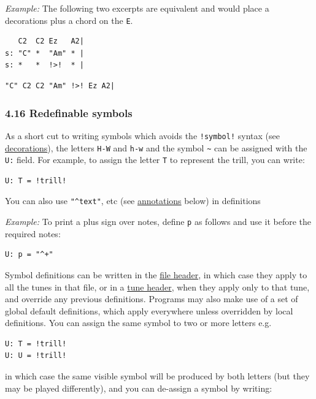 \documentclass[oneside]{book}
\begin{document}
\emph{Example:} The following two excerpts are equivalent and would
place a decorations plus a chord on the \texttt{E}.

\begin{verbatim}
   C2  C2 Ez   A2|
s: "C" *  "Am" * |
s: *   *  !>!  * |
\end{verbatim}

\begin{verbatim}
"C" C2 C2 "Am" !>! Ez A2|
\end{verbatim}

\hypertarget{redefinable_symbols}{\subsubsection{4.16 Redefinable
symbols}\label{redefinable_symbols}}

As a short cut to writing symbols which avoids the \texttt{!symbol!}
syntax (see \protect\hyperlink{decorations}{decorations}), the letters
\texttt{H-W} and \texttt{h-w} and the symbol \texttt{\textasciitilde{}}
can be assigned with the \texttt{U:} field. For example, to assign the
letter \texttt{T} to represent the trill, you can write:

\begin{verbatim}
U: T = !trill!
\end{verbatim}

You can also use \texttt{"\^{}text"}, etc (see
\protect\hyperlink{annotations}{annotations} below) in definitions

\emph{Example:} To print a plus sign over notes, define \texttt{p} as
follows and use it before the required notes:

\begin{verbatim}
U: p = "^+"
\end{verbatim}

Symbol definitions can be written in the
\protect\hyperlink{file_header_definition}{file header}, in which case
they apply to all the tunes in that file, or in a
\protect\hyperlink{tune_header_definition}{tune header}, when they apply
only to that tune, and override any previous definitions. Programs may
also make use of a set of global default definitions, which apply
everywhere unless overridden by local definitions. You can assign the
same symbol to two or more letters e.g.

\begin{verbatim}
U: T = !trill!
U: U = !trill!
\end{verbatim}

in which case the same visible symbol will be produced by both letters
(but they may be played differently), and you can de-assign a symbol by
writing:
\end{document}
